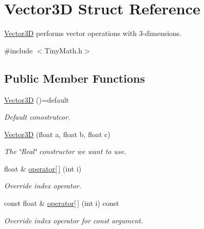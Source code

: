 \hypertarget{struct_vector3_d}{}\section{Vector3D Struct Reference}
\label{struct_vector3_d}


\mbox{\hyperlink{struct_vector3_d}{Vector3D}} performs vector operations with 3-\/dimensions.  




{\ttfamily \#include $<$Tiny\+Math.\+h$>$}

\subsection*{Public Member Functions}
\begin{DoxyCompactItemize}
\item 
\mbox{\label{struct_vector3_d_aefc51b14ad29d8c0844bda043c97db6e}} 
\mbox{\hyperlink{struct_vector3_d_aefc51b14ad29d8c0844bda043c97db6e}{Vector3D}} ()=default
\begin{DoxyCompactList}\small\item\em Default conostrutcor. \end{DoxyCompactList}\item 
\mbox{\hyperlink{struct_vector3_d_a7b0f18fa43c7a90588dedcd814122359}{Vector3D}} (float a, float b, float c)
\begin{DoxyCompactList}\small\item\em The \char`\"{}\+Real\char`\"{} constructor we want to use. \end{DoxyCompactList}\item 
float \& \mbox{\hyperlink{struct_vector3_d_a9ada0b9382fdaf3bade67438f829280d}{operator\mbox{[}$\,$\mbox{]}}} (int i)
\begin{DoxyCompactList}\small\item\em Override index operator. \end{DoxyCompactList}\item 
const float \& \mbox{\hyperlink{struct_vector3_d_aeb8dfce8e40587899758e9f7d5752dc6}{operator\mbox{[}$\,$\mbox{]}}} (int i) const
\begin{DoxyCompactList}\small\item\em Override index operator for const argument. \end{DoxyCompactList}\item 
\mbox{\label{struct_vector3_d_a83d5f64613f79d60e080dc04689f1c2b}} 

\end{DoxyCompactItemize}
